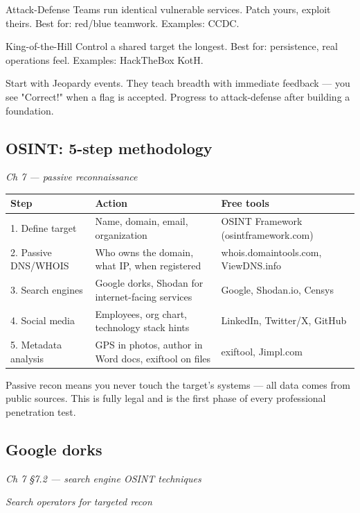 \documentclass[12pt,openany]{book}
\begin{document}
Attack-Defense
Teams run identical vulnerable services. Patch yours, exploit theirs.
Best for: red/blue teamwork.
Examples: CCDC.

King-of-the-Hill
Control a shared target the longest.
Best for: persistence, real operations feel.
Examples: HackTheBox KotH.

Start with Jeopardy events. They teach breadth with immediate feedback --- you see "Correct!" when a flag is accepted. Progress to attack-defense after building a foundation.

\medskip

\subsection*{OSINT: 5-step methodology}
{\small\itshape\color{gray}Ch 7 --- passive reconnaissance}

\begin{center}\small\begin{tabular}{p{4.3cm}p{4.3cm}p{4.3cm}}\toprule
\textbf{Step} & \textbf{Action} & \textbf{Free tools} \\ \midrule
1. Define target & Name, domain, email, organization & OSINT Framework (osintframework.com) \\
2. Passive DNS/WHOIS & Who owns the domain, what IP, when registered & whois.domaintools.com, ViewDNS.info \\
3. Search engines & Google dorks, Shodan for internet-facing services & Google, Shodan.io, Censys \\
4. Social media & Employees, org chart, technology stack hints & LinkedIn, Twitter/X, GitHub \\
5. Metadata analysis & GPS in photos, author in Word docs, exiftool on files & exiftool, Jimpl.com \\
\bottomrule\end{tabular}\end{center}


Passive recon means you never touch the target's systems --- all data comes from public sources. This is fully legal and is the first phase of every professional penetration test.

\medskip

\subsection*{Google dorks}
{\small\itshape\color{gray}Ch 7 §7.2 --- search engine OSINT techniques}

{\small\itshape\color{gray}Search operators for targeted recon}
\end{document}

